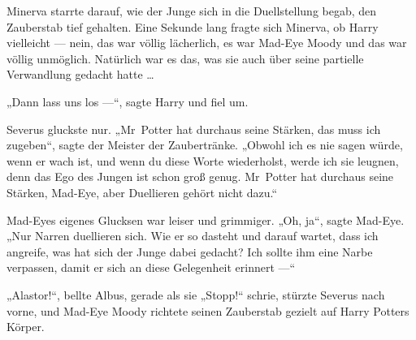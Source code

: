 \later

Minerva starrte darauf, wie der Junge sich in die Duellstellung begab, den Zauberstab tief gehalten. Eine Sekunde lang fragte sich Minerva, ob Harry vielleicht — nein, das war völlig lächerlich, es war Mad-Eye Moody und das war völlig unmöglich. Natürlich war es das, was sie auch über seine partielle Verwandlung gedacht hatte …

„Dann lass uns los —“, sagte Harry und fiel um.

Severus gluckste nur.
„Mr~Potter hat durchaus seine Stärken, das muss ich zugeben“, sagte der Meister der Zaubertränke.
„Obwohl ich es nie sagen würde, wenn er wach ist, und wenn du diese Worte wiederholst, werde ich sie leugnen, denn das Ego des Jungen ist schon groß genug. Mr~Potter hat durchaus seine Stärken, Mad-Eye, aber Duellieren gehört nicht dazu.“

Mad-Eyes eigenes Glucksen war leiser und grimmiger.
„Oh, ja“, sagte Mad-Eye.
„Nur Narren duellieren sich. Wie er so dasteht und darauf wartet, dass ich angreife, was hat sich der Junge dabei gedacht? Ich sollte ihm eine Narbe verpassen, damit er sich an diese Gelegenheit erinnert —“

„Alastor!“, bellte Albus, gerade als sie
„Stopp!“ schrie, stürzte Severus nach vorne, und Mad-Eye Moody richtete seinen Zauberstab gezielt auf Harry Potters Körper.


